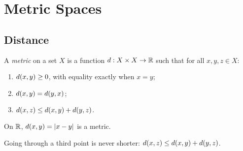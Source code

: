 \chapter{Metric Spaces}

\section{Distance}

\begin{definition}[Metric]
A \emph{metric} on a set $X$ is a function $d : X \times X \to \mathbb{R}$ such that for all $x, y, z \in X$:
\begin{enumerate}
  \item $d(x, y) \ge 0$, with equality exactly when $x = y$;
  \item $d(x, y) = d(y, x)$;
  \item $d(x, z) \le d(x, y) + d(y, z)$.
\end{enumerate}
\end{definition}

\begin{example}
On $\mathbb{R}$, $d(x, y) = \left\lvert x - y \right\rvert$ is a metric.
\end{example}

\begin{center}
\end{center}

\begin{important}
Going through a third point is never shorter: $d(x, z) \le d(x, y) + d(y, z)$.
\end{important}
